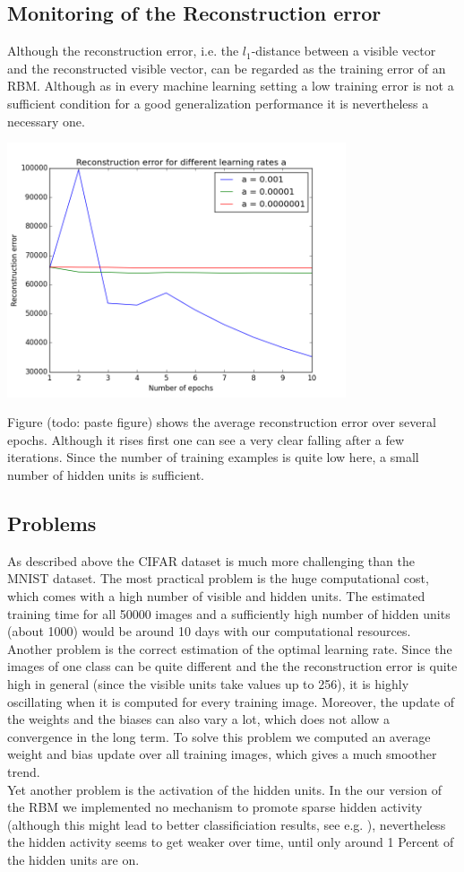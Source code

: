 \documentclass[a4paper]{scrartcl}
\begin{document}
\subsection{Monitoring of the Reconstruction error}
Although the reconstruction error, i.e. the $l_1$-distance between a visible vector and the reconstructed visible vector, can be regarded as the training error of an RBM. Although as in every machine learning setting a low training error is not a sufficient condition for a good generalization performance it is nevertheless a necessary one.
\begin{center}
\includegraphics[width=10cm]{images/cifarreconerr.png}
\end{center} 
Figure (todo: paste figure) shows the average reconstruction error over several epochs. Although it rises first one can see a very clear falling after a few iterations. Since the number of training examples is quite low here, a small number of hidden units is sufficient.
\subsection{Problems}
As described above the CIFAR dataset is much more challenging than the MNIST dataset. The most practical problem is the huge computational cost, which comes with a high number of visible and hidden units. The estimated training time for all 50000 images and a sufficiently high number of hidden units (about 1000) would be around 10 days with our computational resources.\\
Another problem is the correct estimation of the optimal learning rate. Since the images of one class can be quite different and the the reconstruction error is quite high in general (since the visible units take values up to 256), it is highly oscillating when it is computed for every training image. Moreover, the update of the weights and the biases can also vary a lot, which does not allow a convergence in the long term. To solve this problem we computed an average weight and bias update over all training images, which gives a much smoother trend. \\
Yet another problem is the activation of the hidden units. In the our version of the RBM we implemented no mechanism to promote sparse hidden activity (although this might lead to better classificiation results, see e.g. \cite{Larochelle}), nevertheless the hidden activity seems to get weaker over time, until only around 1 Percent of the hidden units are on.
\newpage
\end{document}
